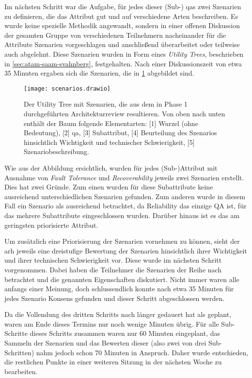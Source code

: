 Im nächsten Schritt war die Aufgabe, für jedes dieser (Sub-) \glspl{qa} zwei Szenarien zu definieren, die das Attribut gut und auf verschiedene Arten beschreiben.
Es wurde keine spezielle Methodik an\-ge\-wandt, sondern in einer offenen Diskussion der gesamten Gruppe von verschiedenen Teil\-neh\-mern nacheinander für die Attribute Szenarien vorgeschlagen und anschließend überarbeitet oder teilweise auch abgelehnt.
Diese Szenarien wurden in Form eines \emph{Utility Trees}, beschrieben in \cref{sec:atam-saam-svahnberg}, festgehalten.
Nach einer Diskussionszeit von etwa 35 Minuten ergaben sich die Szenarien, die in  \cref{fig:scenarios} abgebildet sind.

\begin{figure}
	\centering
	\texttt{[image: scenarios.drawio]}
	\caption[Utility Tree des Architekturreviews mit  und Szenarien]{
		Der Utility Tree mit Szenarien, die aus dem in Phase 1 durchgeführten Ar\-chi\-tek\-tur\-review resultieren.
		Von oben nach unten enthält der Baum folgende Elementarten: [1] Wurzel (ohne Bedeutung), [2] \gls{qa}, [3] Subattribut, [4] Be\-ur\-teilung des Szenarios hinsichtlich Wichtigkeit und technischer Schwierigkeit, [5] Szenariobeschreibung.
	}
	\label{fig:scenarios}
\end{figure}

Wie aus der Abbildung ersichtlich, wurden für jedes (Sub-)Attribut mit Ausnahme von \emph{Fault Tolerance} und \emph{Recoverability} jeweils zwei Szenarien erstellt.
Dies hat zwei Gründe.
Zum einen wurden für diese Subattribute keine ausreichend unterschiedlichen Szenarien gefunden.
Zum anderen wurde in diesem Fall ein Szenario als ausreichend betrachtet, da Reliability das einzige QA ist, für das mehrere Subattribute eingeschlossen wurden.
Darüber hinaus ist es das am geringsten priorisierte Attribut.

Um zusätzlich eine Priorisierung der Szenarien vornehmen zu können, sieht der \gls{arh} jeweils eine dreistufige Bewertung der Szenarien hinsichtlich ihrer Wichtigkeit und ihrer technischen Schwierigkeit vor.
Diese wurde im nächsten Schritt vorgenommen.
Dabei haben die Teilnehmer die Szenarien der Reihe nach betrachtet und die genannten Eigenschaften diskutiert.
Nicht immer waren alle anfangs einer Meinung, doch schlussendlich konnte nach etwa 35 Minuten für jedes Szenario Konsens gefunden und dieser Schritt abgeschlossen werden.

Da die Vollendung des dritten Schritts nach  länger gedauert hat als geplant, waren am Ende dieses Termins nur noch wenige Minuten übrig.
Für alle Sub-Schritte dieses Schritts zusammen waren nur 60 Minuten eingeplant, das Sammeln der Szenarien und das Bewerten dieser (also zwei von drei Sub-Schritten) nahm jedoch schon 70 Minuten in Anspruch.
Daher wurde entschieden, die restlichen Punkte in einer weiteren Sitzung in der nächsten Woche zu bearbeiten.

